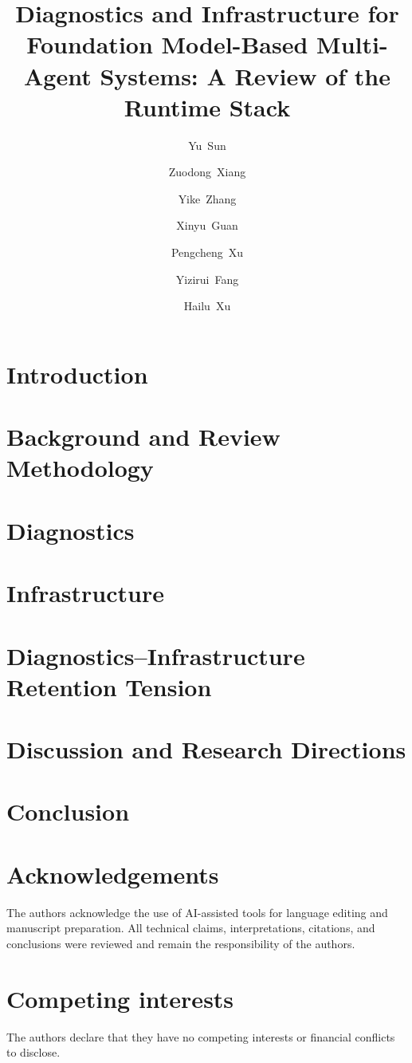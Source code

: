 \documentclass[review]{fcs}
\title{Diagnostics and Infrastructure for Foundation Model-Based Multi-Agent Systems: A Review of the Runtime Stack}
\author[1,+]{Yu~Sun}
\author[2]{Zuodong~Xiang}
\author[3]{Yike~Zhang}
\author[4]{Xinyu~Guan}
\author[5]{Pengcheng~Xu}
\author[3]{Yizirui~Fang}
\author[6]{Hailu~Xu}
\begin{document}
\section{Introduction}\label{sec:introduction}


\section{Background and Review Methodology}\label{sec:background}


\section{Diagnostics}\label{sec:diagnostics}


\section{Infrastructure}\label{sec:infrastructure}


\section{Diagnostics--Infrastructure Retention Tension}\label{sec:tension}


\section{Discussion and Research Directions}\label{sec:discussion}


\section{Conclusion}\label{sec:conclusion}


\fontsize{8.5pt}{10pt}\selectfont

\section*{Acknowledgements}
The authors acknowledge the use of AI-assisted tools for language editing and manuscript preparation. All technical claims, interpretations, citations, and conclusions were reviewed and remain the responsibility of the authors.

\section*{Competing interests}
The authors declare that they have no competing interests or financial conflicts to disclose.



\end{document}
